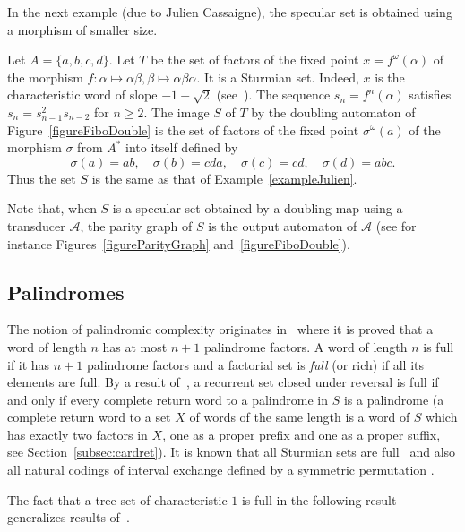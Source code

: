 \documentclass[preprint,12pt]{elsarticle}
\newcommand\A{\mathcal{A}}
\numberwithin{theorem}{section}
\numberwithin{equation}{section}
\numberwithin{figure}{section}
\numberwithin{table}{section}
\begin{document}
In the next example (due to Julien Cassaigne), the specular set
is obtained using a morphism of smaller size.
\begin{example}\label{exampleJulien2}
Let $A=\{a,b,c,d\}$.
Let $T$ be the set of factors of the fixed point $x=f^\omega(\alpha)$ of
the morphism $f:\alpha\mapsto \alpha\beta,\beta\mapsto \alpha\beta\alpha$. It is a Sturmian set.
Indeed, $x$ is the characteristic word of slope $-1+\sqrt{2}$
(see~\cite{Lothaire2002}).
The sequence $s_n=f^n(\alpha)$ satisfies $s_n=s_{n-1}^2s_{n-2}$ for $n\ge 2$.
The image $S$ of $T$ by
the doubling  automaton of Figure~\ref{figureFiboDouble} is
the set of factors of the fixed point $\sigma^\omega(a)$
of the morphism $\sigma$ from $A^*$ into
itself defined by 
\begin{displaymath}
\sigma(a)=ab,\quad \sigma(b)=cda,\quad \sigma(c)=cd,\quad \sigma(d)=abc.
\end{displaymath}
Thus the set $S$ is the same as that of Example~\ref{exampleJulien}.
\end{example}

Note that, when $S$ is a specular set obtained by a doubling map using a transducer $\A$, the parity graph of $S$ is the output automaton of $\A$ (see for instance Figures~\ref{figureParityGraph} and~\ref{figureFiboDouble}).



\subsection{Palindromes}
\label{sec:palindromes}

The notion of palindromic complexity originates in~\cite{DroubayJustinPirillo2001} where it is proved that a word of length $n$ has at most $n+1$ palindrome factors.
A word of length $n$ is full if it has $n+1$ palindrome factors and a factorial set is \emph{full} (or rich) if all its elements are full.
By a result of~\cite{GlenJustinWidmerZamboni2009}, a recurrent set closed under reversal is full if and only if every complete return word to a palindrome in $S$ is a palindrome (a complete return word to a set $X$ of words of the same length is a word of $S$ which has exactly two factors in $X$, one as a proper prefix and one as a proper suffix, see Section~\ref{subsec:cardret}).
It is known that all Sturmian sets are full~\cite{DroubayJustinPirillo2001} and also all natural codings of interval exchange defined by a symmetric permutation \cite{BalaziMaskovaPelantova2007}.

The fact that a tree set of characteristic $1$ is full in the following result generalizes results of~\cite{DroubayJustinPirillo2001,BalaziMaskovaPelantova2007}.
\end{document}
